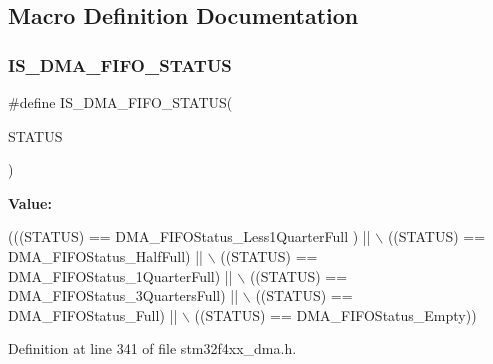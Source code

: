 \subsection{Macro Definition Documentation}
\mbox{\label{group___d_m_a__fifo__status__level_ga6980114eab3b3eea701f3802dd97dc12}} 
\subsubsection{\texorpdfstring{I\+S\+\_\+\+D\+M\+A\+\_\+\+F\+I\+F\+O\+\_\+\+S\+T\+A\+T\+US}{IS\_DMA\_FIFO\_STATUS}}
{\footnotesize\ttfamily \#define I\+S\+\_\+\+D\+M\+A\+\_\+\+F\+I\+F\+O\+\_\+\+S\+T\+A\+T\+US(\begin{DoxyParamCaption}\item[{}]{S\+T\+A\+T\+US }\end{DoxyParamCaption})}

{\bfseries Value\+:}
\begin{DoxyCode}
(((STATUS) == DMA\_FIFOStatus\_Less1QuarterFull ) || \(\backslash\)
                                    ((STATUS) == DMA\_FIFOStatus\_HalfFull)          || \(\backslash\)
                                    ((STATUS) == DMA\_FIFOStatus\_1QuarterFull)      || \(\backslash\)
                                    ((STATUS) == DMA\_FIFOStatus\_3QuartersFull)     || \(\backslash\)
                                    ((STATUS) == DMA\_FIFOStatus\_Full)              || \(\backslash\)
                                    ((STATUS) == DMA\_FIFOStatus\_Empty))
\end{DoxyCode}


Definition at line 341 of file stm32f4xx\+\_\+dma.\+h.

